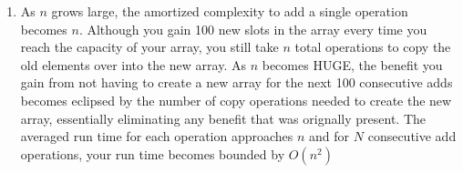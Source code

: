 \documentclass[11pt,a4paper]{article}
\begin{document}
\begin{enumerate}
		\item As $n$ grows large, the amortized complexity to add a single operation becomes $n$. Although you gain 100 new slots in the array every time you reach the capacity of your array, you still take $n$ total operations to copy the old elements over into the new array. As $n$ becomes HUGE, the benefit you gain from not having to create a new array for the next 100 consecutive adds becomes eclipsed by the number of copy operations needed to create the new array, essentially eliminating any benefit that was orignally present. The averaged run time for each operation approaches $n$ and for $N$ consecutive add operations, your run time becomes bounded by $O(n^2)$
	\end{enumerate}
\end{document}
